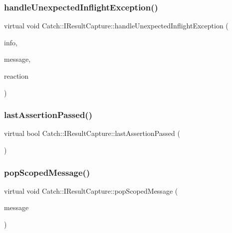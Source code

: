 \subsubsection{\texorpdfstring{handleUnexpectedInflightException()}{handleUnexpectedInflightException()}}
{\footnotesize\ttfamily virtual void Catch\+::\+I\+Result\+Capture\+::handle\+Unexpected\+Inflight\+Exception (\begin{DoxyParamCaption}\item[{\mbox{\hyperlink{struct_catch_1_1_assertion_info}{Assertion\+Info}} const \&}]{info,  }\item[{std\+::string const \&}]{message,  }\item[{\mbox{\hyperlink{struct_catch_1_1_assertion_reaction}{Assertion\+Reaction}} \&}]{reaction }\end{DoxyParamCaption})\hspace{0.3cm}{\ttfamily [pure virtual]}}

\mbox{\label{struct_catch_1_1_i_result_capture_a973435fbdcb2f6f07a0ec5719a01e956}} 
\subsubsection{\texorpdfstring{lastAssertionPassed()}{lastAssertionPassed()}}
{\footnotesize\ttfamily virtual bool Catch\+::\+I\+Result\+Capture\+::last\+Assertion\+Passed (\begin{DoxyParamCaption}{ }\end{DoxyParamCaption})\hspace{0.3cm}{\ttfamily [pure virtual]}}

\mbox{\label{struct_catch_1_1_i_result_capture_a42bcb13276706bf8c3ce081ce16d37fd}} 
\subsubsection{\texorpdfstring{popScopedMessage()}{popScopedMessage()}}
{\footnotesize\ttfamily virtual void Catch\+::\+I\+Result\+Capture\+::pop\+Scoped\+Message (\begin{DoxyParamCaption}\item[{\mbox{\hyperlink{struct_catch_1_1_message_info}{Message\+Info}} const \&}]{message }\end{DoxyParamCaption})\hspace{0.3cm}{\ttfamily [pure virtual]}}

